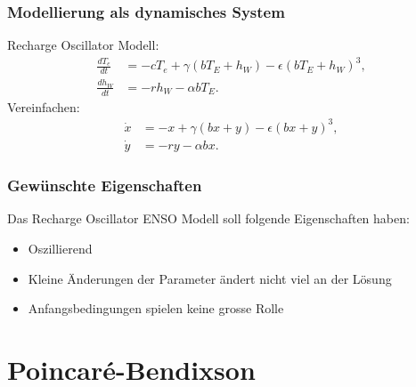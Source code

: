 \documentclass[ngerman, aspectratio=169]{beamer}
\begin{document}
    \begin{frame}
        \frametitle{Modellierung als dynamisches System}
        Recharge Oscillator Modell:
        \begin{align*}
            \frac{dT_e}{dt} &= -cT_e + \gamma \left(bT_E + h_W\right) - \epsilon \left(bT_E + h_W\right)^3, \\
            \frac{dh_W}{dt} &= -rh_W - \alpha b T_E.
        \end{align*}
        \pause
        Vereinfachen:
        \begin{align*}
            \dot{x} &= -x + \gamma \left(bx + y\right) - \epsilon \left(bx + y\right)^3, \\
            \dot{y} &= -ry - \alpha b x.
        \end{align*}
    \end{frame}

    \begin{frame}
    \frametitle{Gewünschte Eigenschaften}
        Das Recharge Oscillator ENSO Modell soll folgende Eigenschaften haben:
        \begin{itemize}
            \item Oszillierend
            \item Kleine Änderungen der Parameter ändert nicht viel an der Lösung
            \item Anfangsbedingungen spielen keine grosse Rolle
        \end{itemize}
    \end{frame}

	\section{Poincaré-Bendixson}
\end{document}
